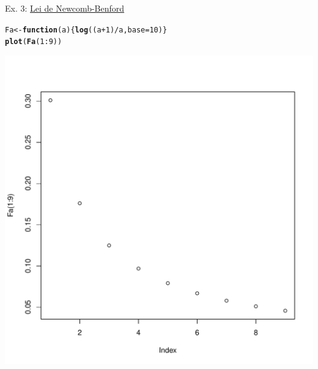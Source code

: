 \documentclass{beamer}\usepackage[]{graphicx}\usepackage[]{xcolor}
\makeatletter
\newcommand{\hlnum}[1]{\textcolor[rgb]{0.686,0.059,0.569}{#1}}%
\newcommand{\hlopt}[1]{\textcolor[rgb]{0,0,0}{#1}}%
\newcommand{\hldef}[1]{\textcolor[rgb]{0.345,0.345,0.345}{#1}}%
\newcommand{\hlkwa}[1]{\textcolor[rgb]{0.161,0.373,0.58}{\textbf{#1}}}%
\newcommand{\hlkwb}[1]{\textcolor[rgb]{0.69,0.353,0.396}{#1}}%
\newcommand{\hlkwc}[1]{\textcolor[rgb]{0.333,0.667,0.333}{#1}}%
\newcommand{\hlkwd}[1]{\textcolor[rgb]{0.737,0.353,0.396}{\textbf{#1}}}%
\newenvironment{kframe}{%
 \def\at@end@of@kframe{}%
 \ifinner\ifhmode%
  \def\at@end@of@kframe{\end{minipage}}%
  \begin{minipage}{\columnwidth}%
 \fi\fi%
 \def\FrameCommand##1{\hskip\@totalleftmargin \hskip-\fboxsep
 \colorbox{shadecolor}{##1}\hskip-\fboxsep
     \hskip-\linewidth \hskip-\@totalleftmargin \hskip\columnwidth}%
 \MakeFramed {\advance\hsize-\width
   \@totalleftmargin\z@ \linewidth\hsize
   \@setminipage}}%
 {\par\unskip\endMakeFramed%
 \at@end@of@kframe}
\newenvironment{knitrout}{}{} %
\makeatother
\begin{document}
\begin{frame}[fragile]{Ex. 3: \href{https://en.wikipedia.org/wiki/Benford\%27s_law}{Lei de Newcomb-Benford}}
\fontsize{8pt}{8pt}\selectfont
\begin{knitrout}
\color{fgcolor}\begin{kframe}
\begin{alltt}
\hldef{Fa} \hlkwb{<-} \hlkwa{function}\hldef{(}\hlkwc{a}\hldef{)\{}\hlkwd{log}\hldef{((a}\hlopt{+}\hlnum{1}\hldef{)}\hlopt{/}\hldef{a,} \hlkwc{base} \hldef{=} \hlnum{10}\hldef{)\}}
\hlkwd{plot}\hldef{(}\hlkwd{Fa}\hldef{(}\hlnum{1}\hlopt{:}\hlnum{9}\hldef{))}
\end{alltt}
\end{kframe}

{\centering \includegraphics[width=.6\linewidth]{figure/Fa-1} 

}


\end{knitrout}
\end{frame}
\end{document}
